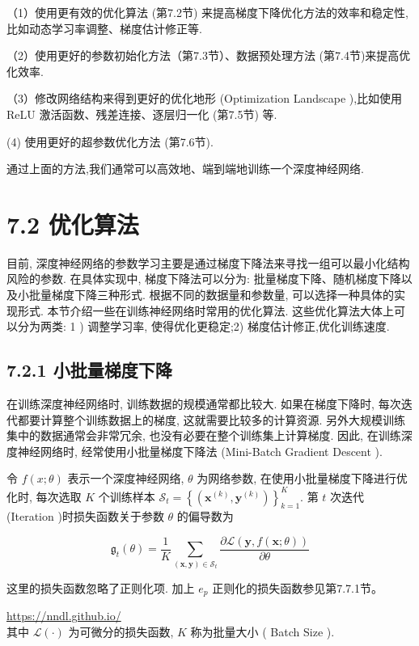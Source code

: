 \documentclass[10pt]{article}
\begin{document}
（1）使用更有效的优化算法 (第7.2节) 来提高梯度下降优化方法的效率和稳定性,比如动态学习率调整、梯度估计修正等.

（2）使用更好的参数初始化方法（第7.3节）、数据预处理方法 (第7.4节)来提高优化效率.

（3）修改网络结构来得到更好的优化地形 (Optimization Landscape ),比如使用 ReLU 激活函数、残差连接、逐层归一化 (第7.5节) 等.

(4) 使用更好的超参数优化方法 (第7.6节).

通过上面的方法,我们通常可以高效地、端到端地训练一个深度神经网络.

\section*{7.2 优化算法}
目前, 深度神经网络的参数学习主要是通过梯度下降法来寻找一组可以最小化结构风险的参数. 在具体实现中, 梯度下降法可以分为: 批量梯度下降、随机梯度下降以及小批量梯度下降三种形式. 根据不同的数据量和参数量, 可以选择一种具体的实现形式. 本节介绍一些在训练神经网络时常用的优化算法. 这些优化算法大体上可以分为两类: 1 ) 调整学习率, 使得优化更稳定;2) 梯度估计修正,优化训练速度.

\subsection*{7.2.1 小批量梯度下降}
在训练深度神经网络时, 训练数据的规模通常都比较大. 如果在梯度下降时, 每次迭代都要计算整个训练数据上的梯度, 这就需要比较多的计算资源. 另外大规模训练集中的数据通常会非常冗余, 也没有必要在整个训练集上计算梯度. 因此, 在训练深度神经网络时, 经常使用小批量梯度下降法 (Mini-Batch Gradient Descent ).

令 $f(x ; \theta)$ 表示一个深度神经网络, $\theta$ 为网络参数, 在使用小批量梯度下降进行优化时, 每次选取 $K$ 个训练样本 $\mathcal{S}_{t}=\left\{\left(\boldsymbol{x}^{(k)}, \boldsymbol{y}^{(k)}\right)\right\}_{k=1}^{K}$. 第 $t$ 次迭代 (Iteration )时损失函数关于参数 $\theta$ 的偏导数为


\begin{equation*}
\mathfrak{g}_{t}(\theta)=\frac{1}{K} \sum_{(\boldsymbol{x}, \boldsymbol{y}) \in \mathcal{S}_{t}} \frac{\partial \mathcal{L}(\boldsymbol{y}, f(\boldsymbol{x} ; \theta))}{\partial \theta} \tag{7.1}
\end{equation*}


这里的损失函数忽略了正则化项. 加上 $e_{p}$ 正则化的损失函数参见第7.7.1节。

\href{https://nndl.github.io/}{https://nndl.github.io/}\\
其中 $\mathcal{L}(\cdot)$ 为可微分的损失函数, $K$ 称为批量大小 ( Batch Size ).
\end{document}
